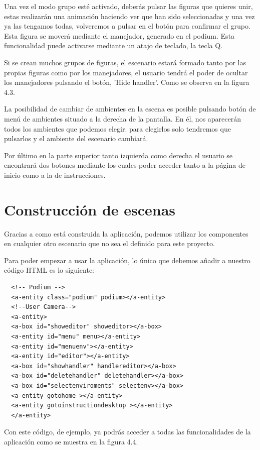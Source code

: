 \documentclass[a4paper, 12pt]{book}
\begin{document}
Una vez el modo grupo esté activado, deberás pulsar las figuras que quieres unir, estas realizarán una animación haciendo ver que han sido seleccionadas y una vez ya las tengamos todas, volveremos a pulsar en el botón para confirmar el grupo. Esta figura se moverá mediante el manejador, generado en el podium. Esta funcionalidad puede activarse mediante un atajo de teclado, la tecla Q.

Si se crean muchos grupos de figuras, el escenario estará formado tanto por las propias figuras como por los manejadores, el usuario tendrá el poder de ocultar los manejadores pulsando el botón, 'Hide handler'. Como se observa en la figura 4.3.

La posibilidad de cambiar de ambientes en la escena es posible pulsando botón de menú de ambientes situado a la derecha de la pantalla. En él, nos aparecerán todos los ambientes que podemos elegir. para elegirlos solo tendremos que pulsarlos y el ambiente del escenario cambiará.

Por último en la parte superior tanto izquierda como derecha el usuario se encontrará dos botones mediante los cuales poder acceder tanto a la página de inicio como a la de instrucciones.

\section{Construcción de escenas}
\label{sec:Construcción de escenas}
Gracias a como está construida la aplicación, podemos utilizar los componentes en cualquier otro escenario que no sea el definido para este proyecto.

Para poder empezar a usar la aplicación, lo único que debemos añadir a nuestro código HTML es lo siguiente:

\begin{verbatim}
  <!-- Podium -->
  <a-entity class="podium" podium></a-entity> 
  <!--User Camera-->
  <a-entity>
  <a-box id="showeditor" showeditor></a-box>
  <a-entity id="menu" menu></a-entity>
  <a-entity id="menuenv"></a-entity>
  <a-entity id="editor"></a-entity>
  <a-box id="showhandler" handlereditor></a-box>
  <a-box id="deletehandler" deletehandler></a-box>
  <a-box id="selectenviroments" selectenv></a-box>
  <a-entity gotohome ></a-entity>
  <a-entity gotoinstructiondesktop ></a-entity>
  </a-entity>
\end{verbatim}

Con este código, de ejemplo, ya podrás acceder a todas las funcionalidades de la aplicación como se muestra en la figura 4.4.
\end{document}
